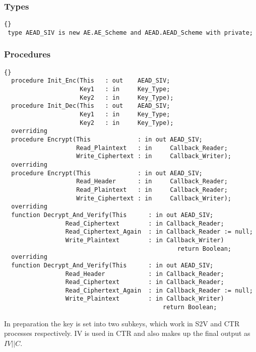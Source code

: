 \subsubsection*{Types}
\begin{lstlisting}{}
 type AEAD_SIV is new AE.AE_Scheme and AEAD.AEAD_Scheme with private;
\end{lstlisting}
\subsubsection*{Procedures}
\begin{lstlisting}{}
  procedure Init_Enc(This   : out    AEAD_SIV;
                     Key1   : in     Key_Type;
                     Key2   : in     Key_Type);
  procedure Init_Dec(This   : out    AEAD_SIV;
                     Key1   : in     Key_Type;
                     Key2   : in     Key_Type);
  overriding
  procedure Encrypt(This             : in out AEAD_SIV;
                    Read_Plaintext   : in     Callback_Reader;
                    Write_Ciphertext : in     Callback_Writer);
  overriding
  procedure Encrypt(This             : in out AEAD_SIV;
                    Read_Header      : in     Callback_Reader;
                    Read_Plaintext   : in     Callback_Reader;
                    Write_Ciphertext : in     Callback_Writer);
  overriding
  function Decrypt_And_Verify(This      : in out AEAD_SIV;
                 Read_Ciphertext        : in Callback_Reader;
                 Read_Ciphertext_Again  : in Callback_Reader := null;
                 Write_Plaintext        : in Callback_Writer)
                     							return Boolean;
  overriding
  function Decrypt_And_Verify(This      : in out AEAD_SIV;
                 Read_Header            : in Callback_Reader;
                 Read_Ciphertext        : in Callback_Reader;
                 Read_Ciphertext_Again  : in Callback_Reader := null;
                 Write_Plaintext        : in Callback_Writer)
                               				return Boolean;
\end{lstlisting}
In preparation the key is set into two subkeys, which work in S2V and CTR processes respectively. IV is used in CTR and also makes up the final output as $IV||C$.
\newpage
